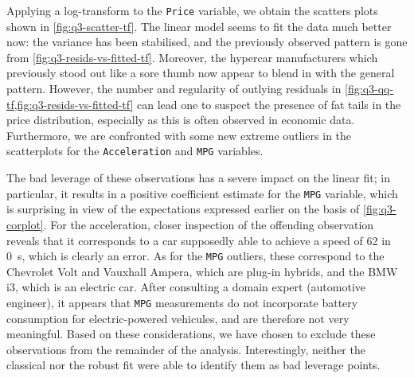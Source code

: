 \documentclass[titlepage]{article}
\begin{document}
Applying a log-transform to the \texttt{Price} variable, we obtain the scatters plots shown in \cref{fig:q3-scatter-tf}. The linear model seems to fit the data much better now: the variance has been stabilised, and the previously observed pattern is gone from \cref{fig:q3-resids-vs-fitted-tf}. Moreover, the hypercar manufacturers which previously stood out like a sore thumb now appear to blend in with the general pattern. However, the number and regularity of outlying residuals in \cref{fig:q3-qq-tf,fig:q3-resids-vs-fitted-tf} can lead one to suspect the presence of fat tails in the price distribution, especially as this is often observed in economic data. Furthermore, we are confronted with some new extreme outliers in the scatterplots for the \texttt{Acceleration} and \texttt{MPG} variables.

The bad leverage of these observations has a severe impact on the linear fit; in particular, it results in a positive coefficient estimate for the \texttt{MPG} variable, which is surprising in view of the expectations expressed earlier on the basis of \cref{fig:q3-corplot}. For the acceleration, closer inspection of the offending observation reveals that it corresponds to a car supposedly able to achieve a speed of \SI{62}{\mph} in \SI{0}{\s}, which is clearly an error. As for the \texttt{MPG} outliers, these correspond to the Chevrolet Volt and Vauxhall Ampera, which are plug-in hybrids, and the BMW i3, which is an electric car. After consulting a domain expert (automotive engineer), it appears that \texttt{MPG} measurements do not incorporate battery consumption for electric-powered vehicules, and are therefore not very meaningful. Based on these considerations, we have chosen to exclude these observations from the remainder of the analysis. Interestingly, neither the classical nor the robust fit were able to identify them as bad leverage points.
\end{document}
